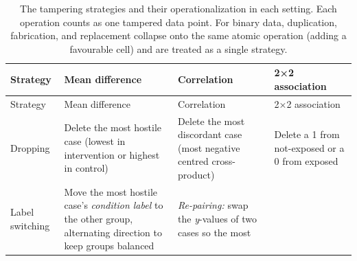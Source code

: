 \documentclass[
  nonatbib,
  authoryear,
  preprint]{elsarticle}
\begin{document}
\begin{longtable}[]{@{}
  >{\raggedright\arraybackslash}p{}
  >{\raggedright\arraybackslash}p{}
  >{\raggedright\arraybackslash}p{}
  >{\raggedright\arraybackslash}p{}@{}}
\caption{The tampering strategies and their operationalization in each
setting. Each operation counts as one tampered data point. For binary
data, duplication, fabrication, and replacement collapse onto the same
atomic operation (adding a favourable cell) and are treated as a single
strategy.}\label{tbl-strategies}\tabularnewline
\toprule\noalign{}
\begin{minipage}[b]{\linewidth}\raggedright
Strategy
\end{minipage} & \begin{minipage}[b]{\linewidth}\raggedright
Mean difference
\end{minipage} & \begin{minipage}[b]{\linewidth}\raggedright
Correlation
\end{minipage} & \begin{minipage}[b]{\linewidth}\raggedright
2×2 association
\end{minipage} \\
\midrule\noalign{}
\endfirsthead
\toprule\noalign{}
\begin{minipage}[b]{\linewidth}\raggedright
Strategy
\end{minipage} & \begin{minipage}[b]{\linewidth}\raggedright
Mean difference
\end{minipage} & \begin{minipage}[b]{\linewidth}\raggedright
Correlation
\end{minipage} & \begin{minipage}[b]{\linewidth}\raggedright
2×2 association
\end{minipage} \\
\midrule\noalign{}
\endhead
\bottomrule\noalign{}
\endlastfoot
Dropping & Delete the most hostile case (lowest in intervention or
highest in control) & Delete the most discordant case (most negative
centred cross-product) & Delete a 1 from not-exposed or a 0 from
exposed \\
Label switching & Move the most hostile case's \emph{condition label} to
the other group, alternating direction to keep groups balanced &
\emph{Re-pairing:} swap the \emph{y}-values of two cases so the most

\end{longtable}
\end{document}
